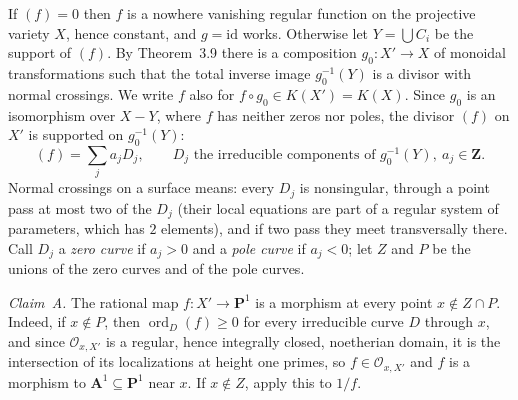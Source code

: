 \documentclass[11pt]{article}
\begin{document}
\pf
If $(f)=0$ then $f$ is a nowhere vanishing regular function on the projective variety $X$, hence constant, and $g=\mathrm{id}$ works. Otherwise let $Y=\bigcup C_i$ be the support of $(f)$. By Theorem~3.9 there is a composition $g_0:X'\to X$ of monoidal transformations such that the total inverse image $g_0^{-1}(Y)$ is a divisor with normal crossings. We write $f$ also for $f\circ g_0\in K(X')=K(X)$. Since $g_0$ is an isomorphism over $X-Y$, where $f$ has neither zeros nor poles, the divisor $(f)$ on $X'$ is supported on $g_0^{-1}(Y)$:
\[
(f)=\sum_j a_jD_j,\qquad D_j \text{ the irreducible components of } g_0^{-1}(Y),\ a_j\in\mathbf Z .
\]
Normal crossings on a surface means: every $D_j$ is nonsingular, through a point pass at most two of the $D_j$ (their local equations are part of a regular system of parameters, which has $2$ elements), and if two pass they meet transversally there. Call $D_j$ a \emph{zero curve} if $a_j>0$ and a \emph{pole curve} if $a_j<0$; let $Z$ and $P$ be the unions of the zero curves and of the pole curves.

\emph{Claim~A.} The rational map $f:X'\to\mathbf P^1$ is a morphism at every point $x\notin Z\cap P$. Indeed, if $x\notin P$, then $\operatorname{ord}_D(f)\ge0$ for every irreducible curve $D$ through $x$, and since $\mathcal O_{x,X'}$ is a regular, hence integrally closed, noetherian domain, it is the intersection of its localizations at height one primes, so $f\in\mathcal O_{x,X'}$ and $f$ is a morphism to $\mathbf A^1\subseteq\mathbf P^1$ near $x$. If $x\notin Z$, apply this to $1/f$.
\end{document}
